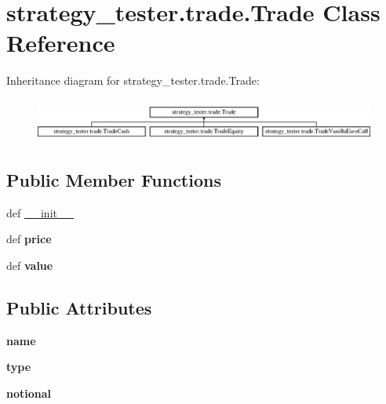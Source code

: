 \hypertarget{classstrategy__tester_1_1trade_1_1Trade}{\section{strategy\-\_\-tester.\-trade.\-Trade \-Class \-Reference}
\label{classstrategy__tester_1_1trade_1_1Trade}
}
\-Inheritance diagram for strategy\-\_\-tester.\-trade.\-Trade\-:\begin{figure}[H]
\begin{center}
\leavevmode
\includegraphics[height=1.430396cm]{classstrategy__tester_1_1trade_1_1Trade}
\end{center}
\end{figure}
\subsection*{\-Public \-Member \-Functions}
\begin{DoxyCompactItemize}
\item 
def \hyperlink{classstrategy__tester_1_1trade_1_1Trade_a23652555198c74aaf7ccc1beeda92897}{\-\_\-\-\_\-init\-\_\-\-\_\-}
\item 
\hypertarget{classstrategy__tester_1_1trade_1_1Trade_a30e3cc354ec1e4d8a2a99cf468f2b66f}{def {\bfseries price}}\label{classstrategy__tester_1_1trade_1_1Trade_a30e3cc354ec1e4d8a2a99cf468f2b66f}

\item 
\hypertarget{classstrategy__tester_1_1trade_1_1Trade_abbe3b9aa5da49fd462783587acbda850}{def {\bfseries value}}\label{classstrategy__tester_1_1trade_1_1Trade_abbe3b9aa5da49fd462783587acbda850}

\end{DoxyCompactItemize}
\subsection*{\-Public \-Attributes}
\begin{DoxyCompactItemize}
\item 
\hypertarget{classstrategy__tester_1_1trade_1_1Trade_a375510bf34f85e631575c2e64363c207}{{\bfseries name}}\label{classstrategy__tester_1_1trade_1_1Trade_a375510bf34f85e631575c2e64363c207}

\item 
\hypertarget{classstrategy__tester_1_1trade_1_1Trade_aafce9b484e3c9a9ab9b5bc5ce3b4640a}{{\bfseries type}}\label{classstrategy__tester_1_1trade_1_1Trade_aafce9b484e3c9a9ab9b5bc5ce3b4640a}

\item 
\hypertarget{classstrategy__tester_1_1trade_1_1Trade_a5c3e969e140542c42b2c52b314cc11d7}{{\bfseries notional}}\label{classstrategy__tester_1_1trade_1_1Trade_a5c3e969e140542c42b2c52b314cc11d7}

\end{DoxyCompactItemize}


